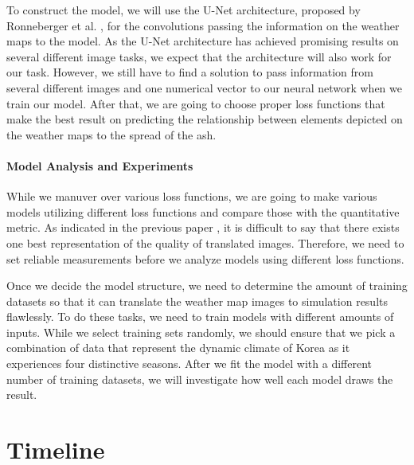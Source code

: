 \documentclass{article}
\begin{document}
\begin{doublespacing}
{  To construct the model, we will use the U-Net architecture, proposed by Ronneberger et al.
  \cite{ronneberger2015unet}, for the convolutions passing the information on the weather maps to 
  the model. As the U-Net architecture has achieved promising results on several different
  image tasks\cite{isola2016imagetoimage,james2018simtoreal}, we expect that the architecture will 
  also work for our task. However, we still have to find a solution to pass information from several
  different images and one numerical vector to our neural network when we train our model. After 
  that, we are going to choose proper loss functions that make the best result on predicting the 
  relationship between elements depicted on the weather maps to the spread of the ash.

  \paragraph{Model Analysis and Experiments}
  While we manuver over various loss functions, we are going to make various models utilizing 
  different loss functions and compare those with the quantitative metric. As indicated in the 
  previous paper \cite{isola2016imagetoimage}, it is difficult to say that there exists one best 
  representation of the quality of translated images. Therefore, we need to set reliable 
  measurements before we analyze models using different loss functions.

  Once we decide the model structure, we need to determine the amount of training datasets so that 
  it can translate the weather map images to simulation results flawlessly. To do these tasks, we 
  need to train models with different amounts of inputs. While we select training sets randomly, we 
  should ensure that we pick a combination of data that represent the dynamic climate of Korea as it
  experiences four distinctive seasons. After we fit the model with a different number of training 
  datasets, we will investigate how well each model draws the result.
}

\section{Timeline} %
\fontsize{11pt}{11pt} \selectfont {

  The first thing we should do is to get the input. There is no available API to get the weather 
  maps and data from KMA. Therefore, we must use the interactive website provided by KMA to download
  the data; this is expected to take some time. Moreover, the calculation time for that simulation 
  was not ignorable, according to a previous experiment (it takes approximately one hour to get one 
  output through a laptop with Intel’s i5-3320M CPU). Considering that we have access to better 
  computing power than the previous test, we expect to finish data collection within two months 
  after the project's initiation.

}
\end{doublespacing}
\end{document}
